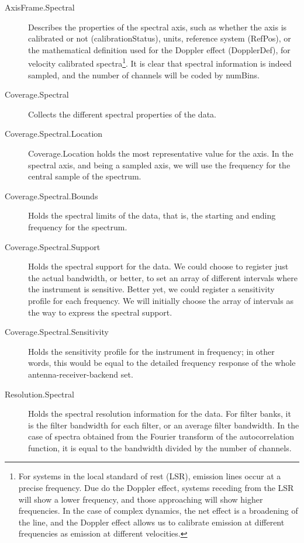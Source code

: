 			\begin{description}
				\item[AxisFrame.Spectral] Describes the 
				properties of the spectral axis, such as whether the
				axis is calibrated or not (calibrationStatus),
				units, reference system (RefPos), or the
				mathematical definition used for the Doppler effect
				(DopplerDef), for velocity calibrated
				spectra\footnote{For systems in the local standard
				of rest (LSR), emission lines occur at a precise
				frequency. Due do the Doppler effect, systems
				receding from the LSR will show a lower frequency,
				and those approaching will show higher frequencies.
				In the case of complex dynamics, the net effect is
				a broadening of the line, and the Doppler effect
				allows us to calibrate emission at different
				frequencies as emission at different velocities.}.
				It is clear that spectral information is indeed
				sampled, and the number of channels will be coded
				by numBins.
				
				 \item[Coverage.Spectral] Collects the different
				spectral properties of the data.
				
				 \item[Coverage.Spectral.Location]
				Coverage.Location holds the most representative
				value for the axis. In the spectral axis, and being
				a sampled axis, we will use the frequency for the
				central sample of the spectrum.
				
				 \item[Coverage.Spectral.Bounds] Holds the spectral
				limits of the data, that is, the starting and
				ending frequency for the spectrum.
				
				 \item[Coverage.Spectral.Support] Holds the
				spectral support for the data. We could choose to
				register just the actual bandwidth, or better, to
				set an array of different intervals where the
				instrument is sensitive. Better yet, we could
				register a sensitivity profile for each frequency.
				We will initially choose the array of intervals as
				the way to express the spectral support.
				
				 \item[Coverage.Spectral.Sensitivity] Holds the
				sensitivity profile for the instrument in
				frequency; in other words, this would be equal to
				the detailed frequency response of the whole
				antenna-receiver-backend set.
				
				 \item[Resolution.Spectral] Holds the spectral
				resolution information for the data. For filter
				banks, it is the filter bandwidth for each filter,
				or an average filter bandwidth. In the case of
				spectra obtained from the Fourier transform of the
				autocorrelation function, it is equal to the
				bandwidth divided by the number of channels.
				

\end{description}
